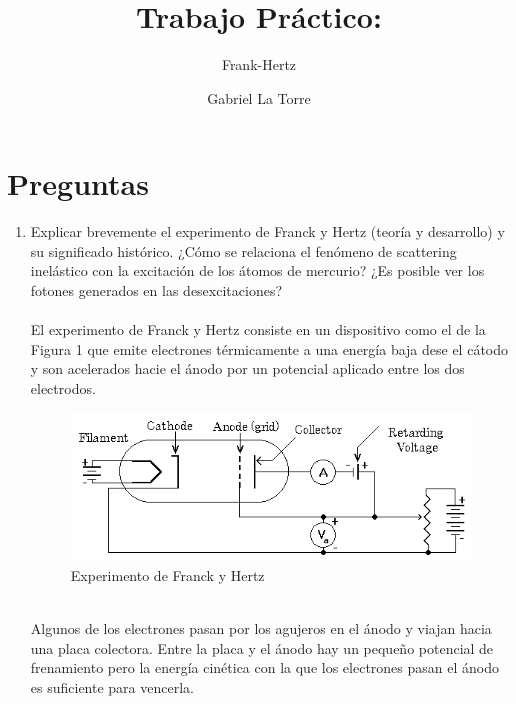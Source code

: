 \documentclass[spanish] {scrartcl}
\begin{document}
\title{Trabajo Práctico:}
\subtitle{Frank-Hertz}
\author{Gabriel La Torre}
\maketitle
\newpage

\section{Preguntas}

 \begin{enumerate}[label=\alph*)]
    \item Explicar brevemente el experimento de Franck y Hertz (teoría y desarrollo) y su 
significado histórico. ¿Cómo se relaciona el fenómeno de scattering inelástico con la 
excitación de los átomos de mercurio? ¿Es posible ver los fotones generados en las 
desexcitaciones? \\
\\
El experimento de Franck y Hertz consiste en un dispositivo como el de la Figura 1 que emite electrones térmicamente a una energía baja dese el cátodo y son acelerados hacie el ánodo por un potencial aplicado entre los dos electrodos.
	\\\begin{figure}[h]
	  \centering
	    \includegraphics[width=\textwidth]{fhtube}
	  \caption{Experimento de Franck y Hertz}
	  \label{Diagrama del experimento de Franck y Hertz}
	\end{figure}\\

Algunos de los electrones pasan por los agujeros en el ánodo y viajan hacia una placa colectora. Entre la placa y el ánodo hay un pequeño potencial de frenamiento pero la energía cinética con la que los electrones pasan el ánodo es suficiente para vencerla. \\


\end{enumerate}
\end{document}
